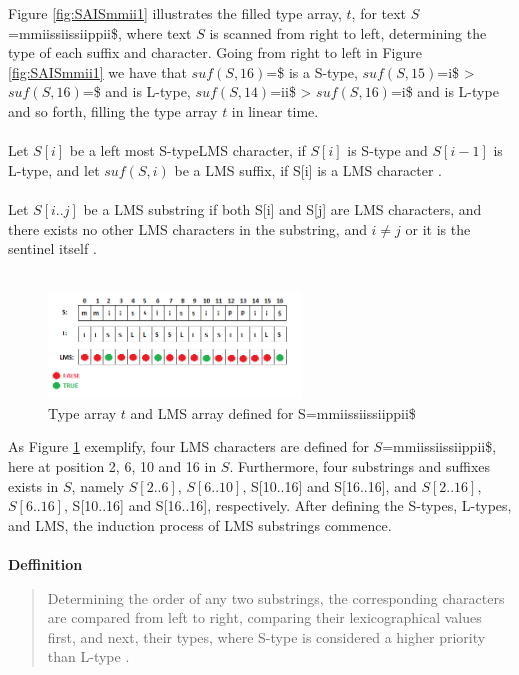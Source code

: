 \documentclass[12pt]{article} %
\begin{document}
Figure \ref{fig:SAISmmii1} illustrates the filled type array, $t$, for text $S$=mmiissiissiippii\$, where text $S$ is scanned from right to left, determining the type of each suffix and character. Going from right to left in Figure \ref{fig:SAISmmii1} we have that $suf(S,16)$=\$ is a S-type, $suf(S,15)$=i\$ > $suf(S,16)$=\$ and is L-type, $suf(S,14)$=ii\$ > $suf(S,16)$=i\$ and is L-type and so forth, filling the type array $t$ in linear time.
\\ \\
Let $S[i]$ be a left most S-typeLMS character, if $S[i]$ is S-type and $S[i-1]$ is L-type, and let $suf(S,i)$ be a LMS suffix, if S[i] is a LMS character \cite{twoeffecient}.
\\ \\
Let $S[i..j]$ be a LMS substring if both S[i] and S[j] are LMS characters, and there exists no other LMS characters in the substring, and $i \neq j$ or it is the sentinel itself \cite{twoeffecient}.
\\ \\

\begin{figure}[H]
    \centering
    \includegraphics[width=0.6\textwidth]{SAISmmii2}
    \captionsetup{width=0.8\textwidth}
    \caption{Type array $t$ and LMS array defined for S=mmiissiissiippii\$}
    \label{fig:SAISmmii2}
\end{figure}

As Figure \ref{fig:SAISmmii2} exemplify, four LMS characters are defined for $S$=mmiissiissiippii\$, here at position 2, 6, 10 and 16 in $S$. Furthermore, four substrings and suffixes exists in $S$, namely $S[2..6]$, $S[6..10]$, S[10..16] and S[16..16], and $S[2..16]$, $S[6..16]$, S[10..16] and S[16..16], respectively.
After defining the S-types, L-types, and LMS, the induction process of LMS substrings commence.
\\ \\

\textbf{Deffinition}
\begin{quote}
Determining the order of any two substrings, the corresponding characters are compared from left to right, comparing their lexicographical values first, and next, their types, where S-type is considered a higher priority than L-type \cite{twoeffecient}.
\end{quote}
\end{document}
